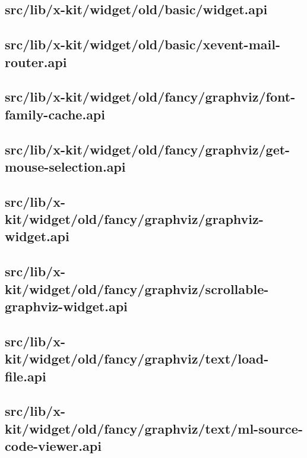 \subsection{src/lib/x-kit/widget/old/basic/widget.api}


\subsection{src/lib/x-kit/widget/old/basic/xevent-mail-router.api}


\subsection{src/lib/x-kit/widget/old/fancy/graphviz/font-family-cache.api}


\subsection{src/lib/x-kit/widget/old/fancy/graphviz/get-mouse-selection.api}


\subsection{src/lib/x-kit/widget/old/fancy/graphviz/graphviz-widget.api}


\subsection{src/lib/x-kit/widget/old/fancy/graphviz/scrollable-graphviz-widget.api}


\subsection{src/lib/x-kit/widget/old/fancy/graphviz/text/load-file.api}


\subsection{src/lib/x-kit/widget/old/fancy/graphviz/text/ml-source-code-viewer.api}


